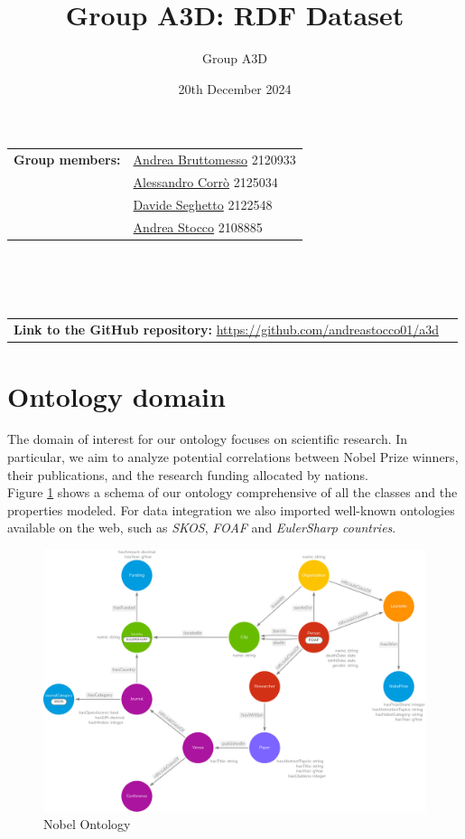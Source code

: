 \documentclass{article}
\title{Group A3D: RDF Dataset}
\author{Group A3D}
\date{20th December 2024}
\begin{document}
\maketitle

\begin{tabular}{@{}ll}
	\textbf{Group members:}
	 & \href{mailto:andrea.bruttomesso.1@studenti.unipd.it}{Andrea Bruttomesso} 2120933 \\
	 & \href{mailto:alessandro.corro.1@studenti.unipd.it}{Alessandro Corr\`o} 2125034   \\
	 & \href{mailto:davide.seghetto@studenti.unipd.it}{Davide Seghetto} 2122548         \\
	 & \href{mailto:andrea.stocco.8@studenti.unipd.it}{Andrea Stocco} 2108885           \\
\end{tabular}
\\\\\\
\begin{tabular}{@{}ll}
	\textbf{Link to the GitHub repository:} \href{https://github.com/andreastocco01/a3d}{https://github.com/andreastocco01/a3d}
\end{tabular}

\section*{Ontology domain}
The domain of interest for our ontology focuses on scientific research. In particular, we aim to analyze potential correlations between Nobel Prize winners,
their publications, and the research funding allocated by nations. \\
Figure \ref{fig:nobelOntology} shows a schema of our ontology comprehensive of all the classes
and the properties modeled. For data integration we also imported well-known ontologies available on the web, such as \textit{SKOS}, \textit{FOAF} and \textit{EulerSharp countries}.

\begin{figure}[ht]
	\centering
	\includegraphics[width=\textwidth]{../nobelOntologyTransparent.png}
	\caption{Nobel Ontology}
	\label{fig:nobelOntology}
\end{figure}
\end{document}
